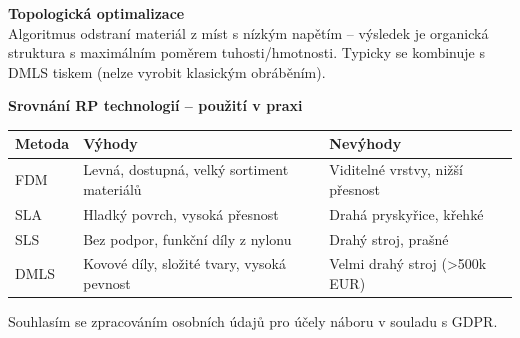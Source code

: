 \documentclass[a4paper,10pt]{article}
\begin{document}
\begin{vysvetlenibox}
\textbf{Topologická optimalizace}\\
Algoritmus odstraní materiál z míst s nízkým napětím -- výsledek
je organická struktura s maximálním poměrem tuhosti/hmotnosti.
Typicky se kombinuje s DMLS tiskem (nelze vyrobit klasickým obráběním).

\textbf{Srovnání RP technologií -- použití v praxi}

\begin{center}
\begin{tabularx}{0.95\linewidth}{@{} l X X @{}}
    \toprule
    \textbf{Metoda} & \textbf{Výhody} & \textbf{Nevýhody} \\
    \midrule
    FDM  & Levná, dostupná, velký sortiment materiálů
         & Viditelné vrstvy, nižší přesnost \\
    SLA  & Hladký povrch, vysoká přesnost
         & Drahá pryskyřice, křehké \\
    SLS  & Bez podpor, funkční díly z nylonu
         & Drahý stroj, prašné \\
    DMLS & Kovové díly, složité tvary, vysoká pevnost
         & Velmi drahý stroj (\textgreater{}500k EUR) \\
    \bottomrule
\end{tabularx}
\end{center}
\end{vysvetlenibox}

\vfill
\noindent\textcolor{medgray}{\small
Souhlasím se zpracováním osobních údajů pro účely náboru v souladu s GDPR.}
\end{document}
